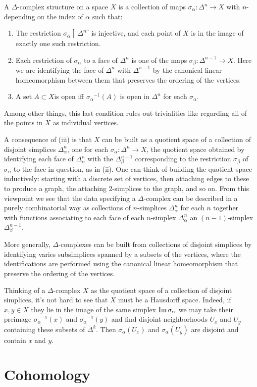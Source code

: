 A $\Delta$-complex structure on a space $X$ is a collection of maps
$\sigma_\alpha\colon\Delta^n\to X$ with $n$-depending on the index of
$\alpha$ such that:
\begin{enumerate}[label=(\roman*)]
\item The restriction
  $\sigma_\alpha\restriction\left.\Delta^n\right.^\circ$ is
  injective, and each point of $X$ is in the image of exactly one such
  restriction.
\item Each restriction of $\sigma_\alpha$ to a face of $\Delta^n$ is one of
  the maps $\sigma_\beta\colon\Delta^{n-1}\to X$. Here we are
  identifying the face of $\Delta^n$ with $\Delta^{n-1}$ by the canonical
  linear homeomorphism between them that preserves the ordering of the
  vertices.
\item A set $A\subset X$is open iff ${\sigma_\alpha}^{-1}(A)$ is open in
  $\Delta^n$ for each $\sigma_\alpha$.
\end{enumerate}
Among other things, this last condition rules out trivialities like
regarding all of the points in $X$ as individual vertices.

A consequence of (iii) is that $X$ can be built as a quotient space of a
collection of disjoint simplices $\Delta_\alpha^n$, one for each
$\sigma_\alpha\colon\Delta^n\to X$, the quotient space obtained by
identifying each face of $\Delta_\alpha^n$ with the $\Delta_\beta^{n-1}$
corresponding to the restriction $\sigma_\beta$ of $\sigma_\alpha$ to the
face in question, as in (ii). One can think of building the quotient space
inductively: starting with a discrete set of vertices, then attaching edges
to these to produce a graph, the attaching $2$-simplices to the graph, and
so on. From this viewpoint we see that the data specifying a
$\Delta$-complex can be described in a purely combinatorial way as
collections of $n$-simplices $\Delta_\alpha^n$ for each $n$ together with
functions associating to each face of each $n$-simplex $\Delta_\alpha^n$ an
$(n-1)$-simplex $\Delta_\beta^{n-1}$.

More generally, $\Delta$-complexes can be built from collections of
disjoint simplices by identifying varies subsimplices spanned by a subsets
of the vertices, where the identifications are performed using the
canonical linear homeomorphism that preserve the ordering of the
vertices.

Thinking of a $\Delta$-complex $X$ as the quotient space of a collection of
disjoint simplices, it's not hard to see that $X$ must be a Hausdorff
space. Indeed, if $x,y\in X$ they lie in the image of the same simplex
$\operatorname{Im}\sigma_\alpha$ we may take their preimage ${\sigma_\alpha}^{-1}(x)$
and ${\sigma_\alpha}^{-1}(y)$ and find disjoint neighborhoods $U_x$ and
$U_y$ containing these subsets of $\Delta^k$. Then $\sigma_\alpha(U_x)$ and
$\sigma_\alpha(U_y)$ are disjoint and contain $x$ and $y$.
\section{Cohomology}

